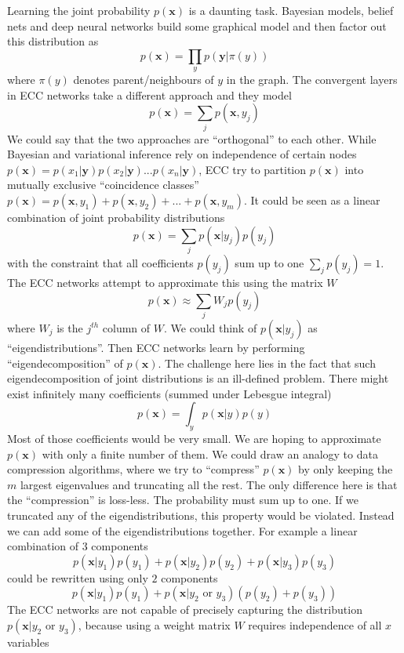 \documentclass[12pt]{article}
\begin{document}
Learning the joint probability $p(\boldsymbol{x})$ is a daunting task. Bayesian models, belief nets and deep neural networks build some graphical model and then factor out this distribution as
\[
p(\boldsymbol{x})=\prod_{y} p(\boldsymbol{y}|\pi(y))
\]
where $\pi(y)$ denotes parent/neighbours of $y$ in the graph. The convergent layers in ECC networks take a different approach and they model 
\[
p(\boldsymbol{x})=\sum_{j} p(\boldsymbol{x},y_j)
\]
We could say that the two approaches are ``orthogonal'' to each other.  While Bayesian and variational inference rely on independence of certain nodes $p(\boldsymbol{x})=p(x_1|\boldsymbol{y})p(x_2|\boldsymbol{y})...p(x_n|\boldsymbol{y})$, ECC try to partition $p(\boldsymbol{x})$ into mutually exclusive ``coincidence classes''
$p(\boldsymbol{x})=p(\boldsymbol{x},y_1)+p(\boldsymbol{x},y_2)+...+p(\boldsymbol{x},y_m)$. It could be seen as a linear combination of joint probability distributions
\[
p(\boldsymbol{x})=\sum_{j} p(\boldsymbol{x}|y_j) p(y_j)
\]
with the constraint that all coefficients $p(y_j)$ sum up to one $\sum_{j} p(y_j)=1$.
The ECC networks attempt to approximate this using the matrix $W$
\[
p(\boldsymbol{x})\approx \sum_{j} W_j p(y_j)
\]
where $W_j$ is the $j^{th}$ column of $W$. We could think of $p(\boldsymbol{x}|y_j)$ as ``eigendistributions''. Then ECC networks learn by performing ``eigendecomposition'' of $p(\boldsymbol{x})$. The challenge here lies in the fact that such eigendecomposition of joint distributions is an ill-defined problem. There might exist infinitely many coefficients (summed under Lebesgue integral)
\[
p(\boldsymbol{x})= \int_y p(\boldsymbol{x}|y) p(y)
\]
Most of those coefficients would be very small. We are hoping to approximate $p(\boldsymbol{x})$ with only a finite number of them. We could draw an analogy to data compression algorithms, where we try to ``compress'' $p(\boldsymbol{x})$ by only keeping the $m$ largest eigenvalues and truncating all the rest. The only difference here is that the ``compression'' is loss-less. The probability must sum up to one. If we truncated any of the eigendistributions,  this property would be violated. Instead we can add some of the eigendistributions together. For example a linear combination of $3$ components
\[
p(\boldsymbol{x}|y_1) p(y_1)+p(\boldsymbol{x}|y_2) p(y_2)+p(\boldsymbol{x}|y_3) p(y_3)
\]
could be rewritten using only $2$ components
\[
p(\boldsymbol{x}|y_1) p(y_1)+p(\boldsymbol{x}|y_2\text{ or }y_3) (p(y_2)+p(y_3))
\]
The ECC networks are not capable of precisely capturing the distribution $p(\boldsymbol{x}|y_2\text{ or }y_3)$, because using a weight matrix $W$ requires independence of all $x$ variables
\end{document}
